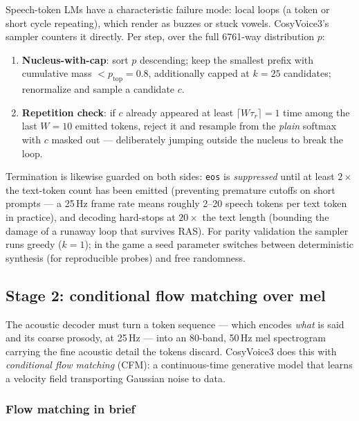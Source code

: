 \documentclass[11pt,a4paper]{article}
\newcommand{\code}[1]{\texttt{#1}}
\begin{document}
Speech-token LMs have a characteristic failure mode: local loops (a token or short cycle
repeating), which render as buzzes or stuck vowels. CosyVoice3's sampler counters it
directly. Per step, over the full 6761-way distribution $p$:
\begin{enumerate}[leftmargin=2em]
\item \textbf{Nucleus-with-cap}: sort $p$ descending; keep the smallest prefix with
cumulative mass $< p_{\mathrm{top}} = 0.8$, additionally capped at $k = 25$ candidates;
renormalize and sample a candidate $c$.
\item \textbf{Repetition check}: if $c$ already appeared at least
$\lceil W \tau_r \rceil = 1$ time among the last $W = 10$ emitted tokens, reject it and
resample from the \emph{plain} softmax with $c$ masked out --- deliberately jumping
outside the nucleus to break the loop.
\end{enumerate}
Termination is likewise guarded on both sides: \code{eos} is \emph{suppressed} until at
least $2\times$ the text-token count has been emitted (preventing premature cutoffs on
short prompts --- a 25\,Hz frame rate means roughly 2--20 speech tokens per text token
in practice), and decoding hard-stops at $20\times$ the text length (bounding the damage
of a runaway loop that survives RAS). For parity validation the sampler runs greedy
($k{=}1$); in the game a seed parameter switches between deterministic synthesis (for
reproducible probes) and free randomness.

\subsection{Stage 2: conditional flow matching over mel}
\label{sec:cfm}

The acoustic decoder must turn a token sequence --- which encodes \emph{what} is said
and its coarse prosody, at 25\,Hz --- into an 80-band, 50\,Hz mel spectrogram carrying
the fine acoustic detail the tokens discard. CosyVoice3 does this with \emph{conditional
flow matching} (CFM): a continuous-time generative model that learns a velocity field
transporting Gaussian noise to data.

\subsubsection{Flow matching in brief}
\end{document}
